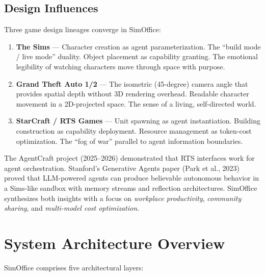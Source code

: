 \documentclass[11pt,letterpaper]{article}
\begin{document}
\subsection{Design Influences}

Three game design lineages converge in SimOffice:

\begin{enumerate}[leftmargin=2em]
  \item \textbf{The Sims} --- Character creation as agent parameterization. The ``build mode / live mode'' duality. Object placement as capability granting. The emotional legibility of watching characters move through space with purpose.

  \item \textbf{Grand Theft Auto 1/2} --- The isometric (45-degree) camera angle that provides spatial depth without 3D rendering overhead. Readable character movement in a 2D-projected space. The sense of a living, self-directed world.

  \item \textbf{StarCraft / RTS Games} --- Unit spawning as agent instantiation. Building construction as capability deployment. Resource management as token-cost optimization. The ``fog of war'' parallel to agent information boundaries.
\end{enumerate}

\noindent
The AgentCraft project (2025--2026) demonstrated that RTS interfaces work for agent orchestration. Stanford's Generative Agents paper (Park et al., 2023) proved that LLM-powered agents can produce believable autonomous behavior in a Sims-like sandbox with memory streams and reflection architectures. SimOffice synthesizes both insights with a focus on \emph{workplace productivity}, \emph{community sharing}, and \emph{multi-model cost optimization}.


\section{System Architecture Overview}

SimOffice comprises five architectural layers:
\end{document}
